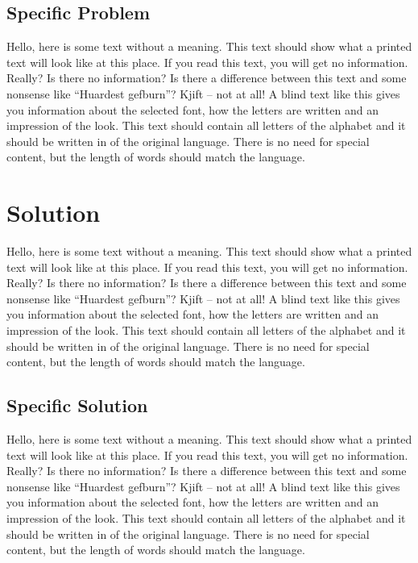\documentclass[%
  english,%
  todotools=true,%
  trtype=singlearticle%
]{hpitr}
\begin{document}
\subsection{Specific Problem}
\label{sec:specific-problem}

Hello, here is some text without a meaning. This text should show
what a printed text will look like at this place. If you read this
text, you will get no information. Really? Is there no information?
Is there a difference between this text and some nonsense like
“Huardest gefburn”? Kjift – not at all! A blind text like this gives
you information about the selected font, how the letters are written
and an impression of the look. This text should contain all letters
of the alphabet and it should be written in of the original
language. There is no need for special content, but the length of
words should match the language.

\section{Solution}
\label{sec:solution}

%
Hello, here is some text without a meaning. This text should show
what a printed text will look like at this place. If you read this
text, you will get no information. Really? Is there no information?
Is there a difference between this text and some nonsense like
“Huardest gefburn”? Kjift – not at all! A blind text like this gives
you information about the selected font, how the letters are written
and an impression of the look. This text should contain all letters
of the alphabet and it should be written in of the original
language. There is no need for special content, but the length of
words should match the language.

\subsection{Specific Solution}
\label{sec:specific-solution}

Hello, here is some text without a meaning. This text should show
what a printed text will look like at this place. If you read this
text, you will get no information. Really? Is there no information?
Is there a difference between this text and some nonsense like
“Huardest gefburn”? Kjift – not at all! A blind text like this gives
you information about the selected font, how the letters are written
and an impression of the look. This text should contain all letters
of the alphabet and it should be written in of the original
language. There is no need for special content, but the length of
words should match the language.
\end{document}
